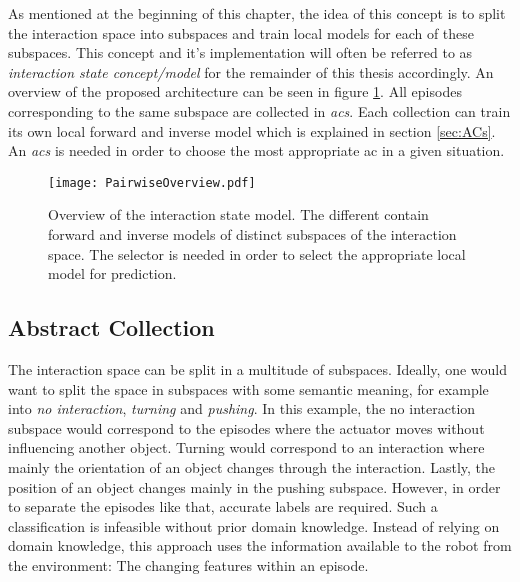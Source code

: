 As mentioned at the beginning of this chapter, the idea of this concept is to split the interaction space into subspaces and train local models for each of these subspaces. This concept and it's implementation will often be referred to as \textit{interaction state concept/model} for the remainder of this thesis accordingly.
An overview of the proposed architecture can be seen in figure \ref{fig:PairOverview}.
All episodes corresponding to the same subspace are collected in \textit{\glspl{ac}}. Each collection can train its own local forward and inverse model which is explained in section \ref{sec:ACs}.
An \textit{\gls{acs}} is needed in order to choose the most appropriate \gls{ac} in a given situation. 


\begin{figure}
	\centering
	\texttt{[image: PairwiseOverview.pdf]}
	\caption{Overview of the interaction state model. The different  contain forward and inverse models of distinct subspaces of the interaction space. The selector is needed in order to select the appropriate local model for prediction.}
	\label{fig:PairOverview}
\end{figure}

\subsection{Abstract Collection \label{sec:ACs}}

The interaction space can be split in a multitude of subspaces. Ideally, one would want to split the space in subspaces with some semantic meaning, for example into \textit{no interaction}, \textit{turning} and \textit{pushing}. In this example, the no interaction subspace would correspond to the episodes where the actuator moves without influencing another object. Turning would correspond to an interaction where mainly the orientation of an object changes through the interaction. Lastly, the position of an object changes mainly in the pushing subspace. However, in order to separate the episodes like that, accurate labels are required. Such a classification is infeasible without prior domain knowledge. 
Instead of relying on domain knowledge, this approach uses the information available to the robot from the environment: The changing features within an episode.

